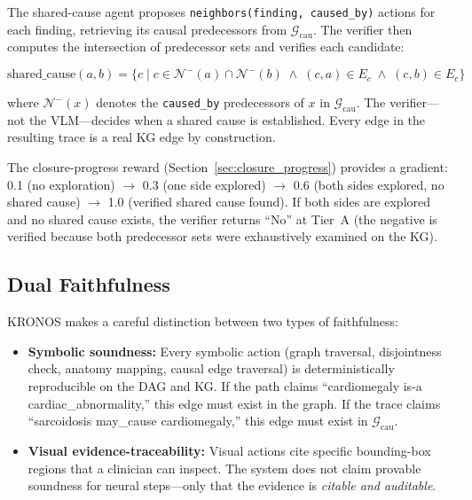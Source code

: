 \documentclass[runningheads]{llncs}
\begin{document}
The shared-cause agent proposes \texttt{neighbors(finding, caused\_by)}
actions for each finding, retrieving its causal predecessors from
$\mathcal{G}_{\text{cau}}$.
The verifier then computes the intersection of predecessor sets and
verifies each candidate:

\begin{equation}
  \text{shared\_cause}(a, b) =
    \{c \mid c \in \mathcal{N}^-(a) \cap \mathcal{N}^-(b)
    \;\wedge\; (c, a) \in E_c \;\wedge\; (c, b) \in E_c\}
  \label{eq:shared_cause}
\end{equation}

\noindent
where $\mathcal{N}^-(x)$ denotes the \texttt{caused\_by} predecessors of
$x$ in $\mathcal{G}_{\text{cau}}$.
The verifier---not the VLM---decides when a shared cause is established.
Every edge in the resulting trace is a real KG edge by construction.

The closure-progress reward (Section~\ref{sec:closure_progress}) provides
a gradient: 0.1 (no exploration) $\to$ 0.3 (one side explored) $\to$
0.6 (both sides explored, no shared cause) $\to$ 1.0 (verified shared
cause found).
If both sides are explored and no shared cause exists, the verifier
returns ``No'' at Tier~A (the negative is verified because both predecessor
sets were exhaustively examined on the KG).


\subsection{Dual Faithfulness}

KRONOS makes a careful distinction between two types of faithfulness:

\begin{itemize}
  \item \textbf{Symbolic soundness:} Every symbolic action (graph traversal,
    disjointness check, anatomy mapping, causal edge traversal) is
    deterministically reproducible on the DAG and KG. If the path claims
    ``cardiomegaly is-a cardiac\_abnormality,'' this edge must exist in the
    graph. If the trace claims ``sarcoidosis may\_cause cardiomegaly,'' this
    edge must exist in $\mathcal{G}_{\text{cau}}$.
  \item \textbf{Visual evidence-traceability:} Visual actions cite specific
    bounding-box regions that a clinician can inspect. The system does not
    claim provable soundness for neural steps---only that the evidence is
    \emph{citable and auditable}.
\end{itemize}
\end{document}
